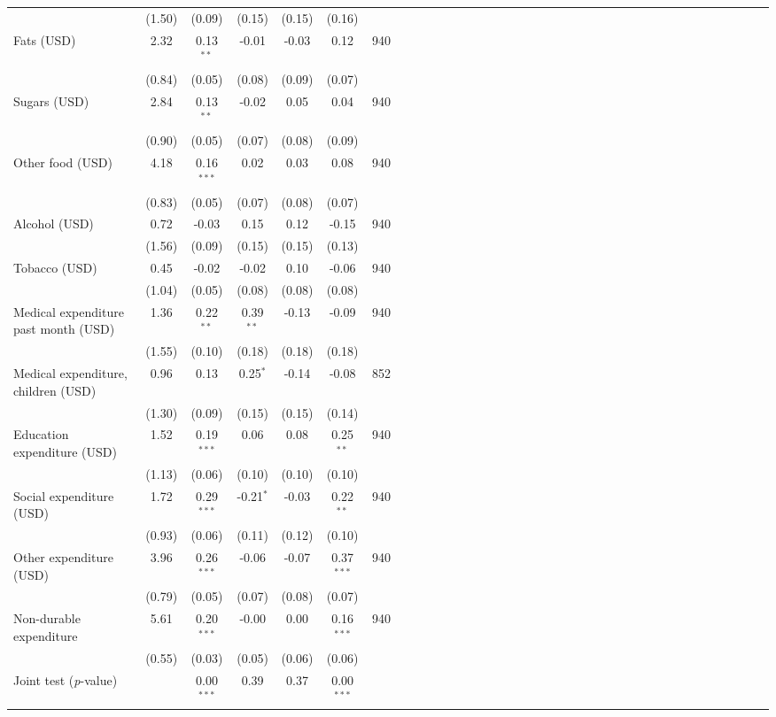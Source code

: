 {\begin{tabular}{l*{6}{SSSSSc}}
          &   (1.50)&   (0.09)&   (0.15)&   (0.15)&   (0.16)&         \\
\hspace{0.2cm}Fats (USD)&     2.32&0.13$^{**}$&    -0.01&    -0.03&     0.12&      940\\
          &   (0.84)&   (0.05)&   (0.08)&   (0.09)&   (0.07)&         \\
\hspace{0.2cm}Sugars (USD)&     2.84&0.13$^{**}$&    -0.02&     0.05&     0.04&      940\\
          &   (0.90)&   (0.05)&   (0.07)&   (0.08)&   (0.09)&         \\
\hspace{0.2cm}Other food (USD)&     4.18&0.16$^{***}$&     0.02&     0.03&     0.08&      940\\
          &   (0.83)&   (0.05)&   (0.07)&   (0.08)&   (0.07)&         \\
Alcohol (USD)&     0.72&    -0.03&     0.15&     0.12&    -0.15&      940\\
          &   (1.56)&   (0.09)&   (0.15)&   (0.15)&   (0.13)&         \\
Tobacco (USD)&     0.45&    -0.02&    -0.02&     0.10&    -0.06&      940\\
          &   (1.04)&   (0.05)&   (0.08)&   (0.08)&   (0.08)&         \\
Medical expenditure past month (USD)&     1.36&0.22$^{**}$&0.39$^{**}$&    -0.13&    -0.09&      940\\
          &   (1.55)&   (0.10)&   (0.18)&   (0.18)&   (0.18)&         \\
\hspace{0.2cm}Medical expenditure, children (USD)&     0.96&     0.13&0.25$^{*}$&    -0.14&    -0.08&      852\\
          &   (1.30)&   (0.09)&   (0.15)&   (0.15)&   (0.14)&         \\
Education expenditure (USD)&     1.52&0.19$^{***}$&     0.06&     0.08&0.25$^{**}$&      940\\
          &   (1.13)&   (0.06)&   (0.10)&   (0.10)&   (0.10)&         \\
Social expenditure (USD)&     1.72&0.29$^{***}$&-0.21$^{*}$&    -0.03&0.22$^{**}$&      940\\
          &   (0.93)&   (0.06)&   (0.11)&   (0.12)&   (0.10)&         \\
Other expenditure (USD)&     3.96&0.26$^{***}$&    -0.06&    -0.07&0.37$^{***}$&      940\\
          &   (0.79)&   (0.05)&   (0.07)&   (0.08)&   (0.07)&         \\
Non-durable expenditure&     5.61&0.20$^{***}$&    -0.00&     0.00&0.16$^{***}$&      940\\
          &   (0.55)&   (0.03)&   (0.05)&   (0.06)&   (0.06)&         \\
\midrule Joint test (\emph{p}-value)&         &0.00$^{***}$&     0.39&     0.37&0.00$^{***}$&         \\
\bottomrule
\end{tabular}
}
